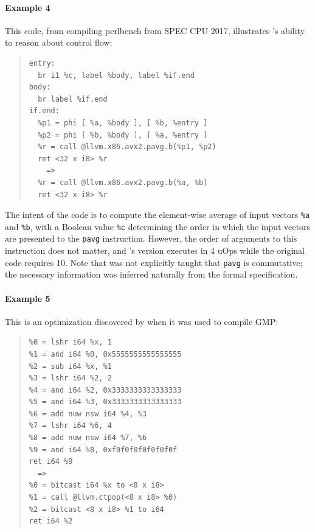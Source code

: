 \paragraph*{Example 4}

This code, from compiling perlbench from SPEC CPU 2017, illustrates
\minotaur's ability to reason about control flow:

{\begin{quote}\begin{verbatim}
entry:
  br i1 %c, label %body, label %if.end
body:
  br label %if.end
if.end:
  %p1 = phi [ %a, %body ], [ %b, %entry ]
  %p2 = phi [ %b, %body ], [ %a, %entry ]
  %r = call @llvm.x86.avx2.pavg.b(%p1, %p2)
  ret <32 x i8> %r
    =>
  %r = call @llvm.x86.avx2.pavg.b(%a, %b)
  ret <32 x i8> %r
\end{verbatim}
\end{quote}}

The intent of the code is to compute the element-wise average of input
vectors \texttt{\%a} and \texttt{\%b}, with a Boolean value
\texttt{\%c} determining the order in which the input vectors are
presented to the \texttt{pavg} instruction.
%
However, the order of arguments to this instruction does not matter, and
\minotaur's version executes in 4 uOps while the original code requires
10.
%
Note that \minotaur{} was not explicitly taught that \texttt{pavg} is
commutative; the necessary information was inferred naturally from the
formal specification.


\paragraph*{Example 5}

This is an optimization discovered
by \minotaur{} when it was used to compile GMP:


{\begin{quote}\begin{verbatim}
%0 = lshr i64 %x, 1
%1 = and i64 %0, 0x5555555555555555
%2 = sub i64 %x, %1
%3 = lshr i64 %2, 2
%4 = and i64 %2, 0x3333333333333333
%5 = and i64 %3, 0x3333333333333333
%6 = add nuw nsw i64 %4, %3
%7 = lshr i64 %6, 4
%8 = add nuw nsw i64 %7, %6
%9 = and i64 %8, 0xf0f0f0f0f0f0f0f
ret i64 %9
  =>
%0 = bitcast i64 %x to <8 x i8>
%1 = call @llvm.ctpop(<8 x i8> %0)
%2 = bitcast <8 x i8> %1 to i64
ret i64 %2
\end{verbatim}
\end{quote}}


